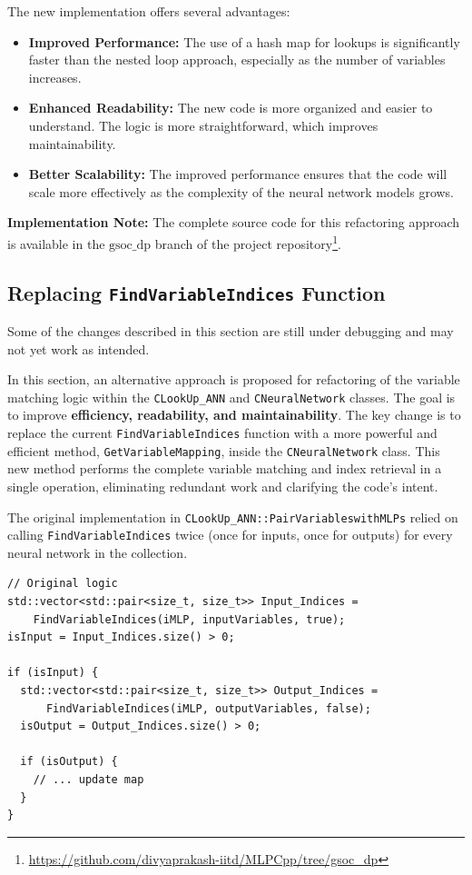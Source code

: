\documentclass{article}
\begin{document}
The new implementation offers several advantages:
\begin{itemize}
    \item \textbf{Improved Performance:} The use of a hash map for lookups is significantly faster than the nested loop approach, especially as the number of variables increases.
    \item \textbf{Enhanced Readability:} The new code is more organized and easier to understand. The logic is more straightforward, which improves maintainability.
    \item \textbf{Better Scalability:} The improved performance ensures that the code will scale more effectively as the complexity of the neural network models grows.
\end{itemize}
\noindent\textbf{Implementation Note:} The complete source code for this refactoring approach is available in the \texttt{$\text{gsoc\_dp}$} branch of the project repository\footnote{\url{https://github.com/divyaprakash-iitd/MLPCpp/tree/gsoc_dp}}.

\subsection{Replacing \texttt{FindVariableIndices} Function}
\label{subsec:varmap2}
\begin{tcolorbox}[colback=bg,colframe=red!60!black,title=Disclaimer]
Some of the changes described in this section are still under debugging and may not yet work as intended.
\end{tcolorbox}
In this section, an alternative approach is proposed for refactoring of the variable matching logic within the \texttt{CLookUp\_ANN} and \texttt{CNeuralNetwork} classes. The goal is to improve \textbf{efficiency, readability, and maintainability}. The key change is to replace the current \texttt{FindVariableIndices} function with a more powerful and efficient method, \texttt{GetVariableMapping}, inside the \texttt{CNeuralNetwork} class. This new method performs the complete variable matching and index retrieval in a single operation, eliminating redundant work and clarifying the code's intent.

The original implementation in \texttt{CLookUp\_ANN::PairVariableswithMLPs} relied on calling \texttt{FindVariableIndices} twice (once for inputs, once for outputs) for every neural network in the collection.

\begin{verbatim}
// Original logic
std::vector<std::pair<size_t, size_t>> Input_Indices =
    FindVariableIndices(iMLP, inputVariables, true);
isInput = Input_Indices.size() > 0;

if (isInput) {
  std::vector<std::pair<size_t, size_t>> Output_Indices =
      FindVariableIndices(iMLP, outputVariables, false);
  isOutput = Output_Indices.size() > 0;

  if (isOutput) {
    // ... update map
  }
}
\end{verbatim}
\end{document}
